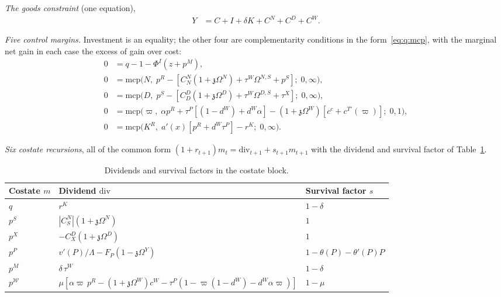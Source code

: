 \emph{The goods constraint} (one equation),
\begin{align}
Y &= C+I+\delta K+C^N+C^D+C^W .
\label{eq:q:goods}
\end{align}

\emph{Five control margins.} Investment is an equality; the other four are complementarity conditions in the form~\eqref{eq:q:mcp}, with the marginal net gain in each case the excess of gain over cost:
\begin{align}
0 &= q-1-\Phi^I\left(z+p^M\right),
\label{eq:q:focI}
\\
0 &= \mathrm{mcp}\Big(N,\; p^R-\left[C^N_N\left(1+\mathfrak z\Omega^N\right)+\tau^W\Omega^{N,S}+p^S\right];\;0,\infty\Big),
\label{eq:q:focN}
\\
0 &= \mathrm{mcp}\Big(D,\; p^S-\left[C^D_D\left(1+\mathfrak z\Omega^D\right)+\tau^W\Omega^{D,S}+\tau^X\right];\;0,\infty\Big),
\label{eq:q:focD}
\\
0 &= \mathrm{mcp}\Big(\varpi,\; \alpha p^R+\tau^P\left[\left(1-d^W\right)+d^W\alpha\right]-\left(1+\mathfrak z\Omega^W\right)\left[c^c+c^{T\prime}\left(\varpi\right)\right];\;0,1\Big),
\label{eq:q:focvarpi}
\\
0 &= \mathrm{mcp}\Big(K^R,\; a'\!\left(x\right)\left[p^R+d^W\tau^P\right]-r^K;\;0,\infty\Big).
\label{eq:q:focKR}
\end{align}

\emph{Six costate recursions}, all of the common form $\left(1+r_{t+1}\right)m_t=\mathrm{div}_{t+1}+s_{t+1}m_{t+1}$ with the dividend and survival factor of Table~\ref{tab:q:costates}.

\begin{table}[H]
\centering
\caption{Dividends and survival factors in the costate block.}\label{tab:q:costates}
\begin{tabular}{lll}
\toprule
Costate $m$ & Dividend $\mathrm{div}$ & Survival factor $s$ \\
\midrule
$q$ & $r^K$ & $1-\delta$ \\
$p^S$ & $\left|C^N_S\right|\left(1+\mathfrak z\Omega^N\right)$ & $1$ \\
$p^X$ & $-C^D_X\left(1+\mathfrak z\Omega^D\right)$ & $1$ \\
$p^P$ & $v'\left(P\right)/\Lambda-F_P\left(1-\mathfrak z\Omega^Y\right)$ & $1-\theta\left(P\right)-\theta'\left(P\right)P$ \\
$p^M$ & $\delta\,\tau^W$ & $1-\delta$ \\
$p^{\mathcal W}$ & $\mu\left[\alpha\varpi\,p^R-\left(1+\mathfrak z\Omega^W\right)c^W-\tau^P\left(1-\varpi\left(1-d^W\right)-d^W\alpha\varpi\right)\right]$ & $1-\mu$ \\
\bottomrule
\end{tabular}
\end{table}

